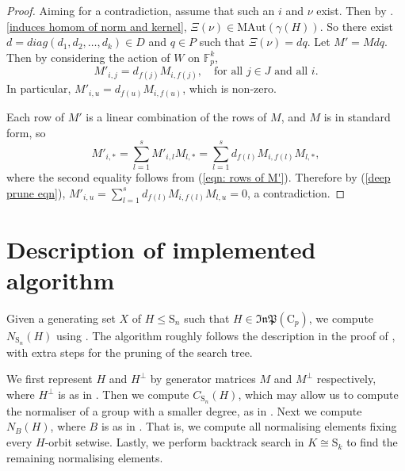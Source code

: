 \documentclass[11pt,a4paper]{article}
\theoremstyle{definition}
\theoremstyle{remark}
\newcommand{\InP}{\mathfrak{InP}}
\newcommand{\MAut}{\mathrm{MAut}}
\newcommand{\Sy}{\mathrm{S}}
\newcommand{\Cy}{\mathrm{C}}
\begin{document}
\begin{proof}
Aiming for a contradiction, assume that such an $i$ and $\nu$ exist. 
Then by .\ref{induces homom of norm and kernel}, $\Xi(\nu) \in \MAut(\gamma(H))$. 
So there exist $d= diag(d_1, d_2, \ldots, d_k) \in D$ and $q \in P$ such that $\Xi(\nu) = dq$. Let $M' = M dq$. Then by considering the action of $W$ on $\mathds{F}_p^k$,  
\begin{equation} \label{eqn: rows of M'}
    M'_{i,j} = d_{f(j)} M_{i, f(j)}, \quad \text{for all $j \in J$ and all $i$.} 
\end{equation}
In particular, $M'_{i,u} = d_{f(u)} M_{i, f(u)} $, which is non-zero. 

Each row of $M'$ is a linear combination of the rows of $M$, and $M$ is in standard form, so 
\[
M'_{i,*} = \sum_{l=1}^s M'_{i,l} M_{l,*}  =  \sum_{l=1}^s d_{f(l)} M_{i,f(l)} M_{l,*} , 
\]
where the second equality follows from (\ref{eqn: rows of M'}). 
Therefore by (\ref{deep prune eqn}), $M'_{i,u} =  \sum_{l=1}^s d_{f(l)}M_{i,f(l)} M_{l,u} =0$, a contradiction.
\end{proof}






\section{Description of implemented algorithm}
\label{section: algorithm}

Given a generating set $X$ of $H \leq \Sy_n$ such that $H \in \InP(\Cy_p)$, we compute $N_{\Sy_n}(H)$ using .
The algorithm roughly follows the description in the proof of , with extra steps for the pruning of the search tree. 

We first represent $H$ and $H^{\bot}$ by generator matrices $M$ and $M^{\bot}$ respectively, where $H^{\bot}$ is as in . Then we compute $C_{\Sy_n}(H)$, which may allow us to compute the normaliser of a group with a smaller degree, as in .
Next we compute $N_{B}(H)$, where $B$ is as in . That is, we compute all normalising elements fixing every $H$-orbit setwise.
Lastly, we perform backtrack search in $K \cong \Sy_k$ to find the remaining normalising elements. 
\end{document}
